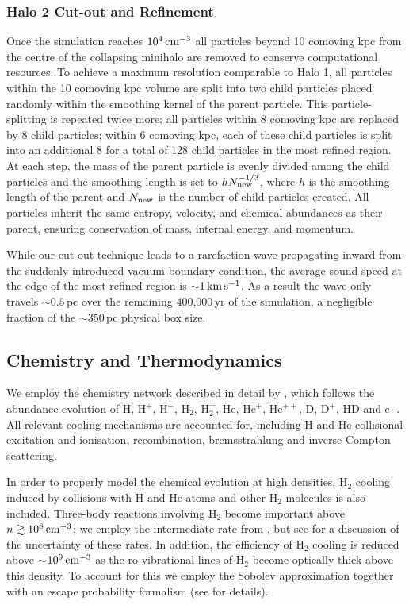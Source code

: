 \documentclass[usenatbib]{mn2e}
\newcommand{\cc}{\,{\rm cm}^{-3}}
\newcommand{\htwo}{\mathrm{H}_2}
\newcommand{\hd}{\mathrm{HD}}
\newcommand{\deut}{\mathrm{D}}
\newcommand{\h}{\mathrm{H}}
\newcommand{\hplus}{\mathrm{H}^+}
\newcommand{\hminus}{\mathrm{H}^-}
\newcommand{\he}{\mathrm{He}}
\newcommand{\heplus}{\mathrm{He}^+}
\begin{document}
\subsubsection{Halo 2 Cut-out and Refinement}
\label{cutout}

Once the simulation reaches $10^4\cc$ all particles beyond 10 comoving kpc from the centre of the collapsing minihalo are removed to conserve computational resources. 
To achieve a maximum resolution comparable to Halo 1, all particles within the 10 comoving kpc volume are split into two child particles placed randomly within the smoothing kernel of the parent particle.  
This particle-splitting is repeated twice more; all particles within 8 comoving kpc are replaced by 8 child particles; within 6 comoving kpc, each of these child particles is split into an additional 8 for a total of 128 child particles in the most refined region.  
At each step, the mass of the parent particle is evenly divided among the child particles and the smoothing length is set to $h N_{\rm new}^{-1/3}$, where $h$ is the smoothing length of the parent and $N_{\rm new}$ is the number of child particles created.  
All particles inherit the same entropy, velocity, and chemical abundances as their parent, ensuring conservation of mass, internal energy, and momentum.

While our cut-out technique leads to a rarefaction wave propagating inward from the suddenly introduced vacuum boundary condition, the average sound speed at the edge of the most refined region is $\sim$$1\,{\rm km}\,{\rm s}^{-1}$.  
As a result the wave only travels $\sim$$0.5\,$pc over the remaining 400,000$\,$yr of the simulation, a negligible fraction of the $\sim$350$\,$pc physical box size.

\subsection{Chemistry and Thermodynamics}
\label{chemistry}
 We employ the chemistry network described in detail by \citet{Greifetal2009b}, which follows the abundance evolution of $\h$, $\hplus$, $\hminus$, $\htwo$, $\htwo^+$, $\he$, $\heplus$, $\he^{++}$, $\deut$, $\deut^+$, $\hd$ and e$^-$. 
 All relevant cooling mechanisms are accounted for, including $\h$ and $\he$ collisional excitation and ionisation, recombination, bremsstrahlung and inverse Compton scattering. 
 
 In order to properly model the chemical evolution at high densities, $\htwo$ cooling induced by collisions with $\h$ and $\he$ atoms and other $\htwo$ molecules is also included.  
 Three-body reactions involving $\htwo$ become important above $n \gtrsim 10^8\cc$; we employ the intermediate rate from \citet{PallaSalpeterStahler1983}, but see \citet{Turketal2011a} for a discussion of the uncertainty of these rates. 
 In addition, the efficiency of $\htwo$ cooling is reduced above $\sim$$10^9\cc$ as the ro-vibrational lines of $\htwo$ become optically thick above this density.  
 To account for this we employ the Sobolev approximation together with an escape probability formalism (see \citealt{Yoshidaetal2006, Greifetal2011} for details). 
\end{document}
